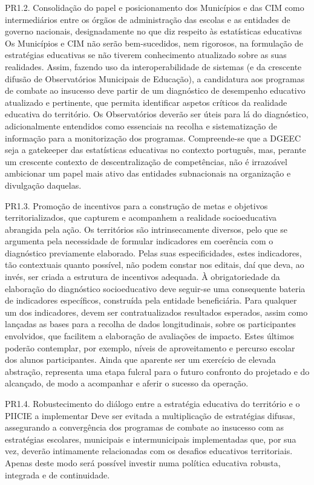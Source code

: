 \documentclass[
]{book}
\begin{document}
PR1.2. Consolidação do papel e posicionamento dos Municípios e das CIM como intermediários entre os órgãos de administração das escolas e as entidades de governo nacionais, designadamente no que diz respeito às estatísticas educativas
Os Municípios e CIM não serão bem-sucedidos, nem rigorosos, na formulação de estratégias educativas se não tiverem conhecimento atualizado sobre as suas realidades. Assim, fazendo uso da interoperabilidade de sistemas (e da crescente difusão de Observatórios Municipais de Educação), a candidatura aos programas de combate ao insucesso deve partir de um diagnóstico de desempenho educativo atualizado e pertinente, que permita identificar aspetos críticos da realidade educativa do território. Os Observatórios deverão ser úteis para lá do diagnóstico, adicionalmente entendidos como essenciais na recolha e sistematização de informação para a monitorização dos programas.
Compreende-se que a DGEEC seja a gatekeeper das estatísticas educativas no contexto português, mas, perante um crescente contexto de descentralização de competências, não é irrazoável ambicionar um papel mais ativo das entidades subnacionais na organização e divulgação daquelas.

PR1.3. Promoção de incentivos para a construção de metas e objetivos territorializados, que capturem e acompanhem a realidade socioeducativa abrangida pela ação.
Os territórios são intrinsecamente diversos, pelo que se argumenta pela necessidade de formular indicadores em coerência com o diagnóstico previamente elaborado. Pelas suas especificidades, estes indicadores, tão contextuais quanto possível, não podem constar nos editais, daí que deva, ao invés, ser criada a estrutura de incentivos adequada. À obrigatoriedade da elaboração do diagnóstico socioeducativo deve seguir-se uma consequente bateria de indicadores específicos, construída pela entidade beneficiária.
Para qualquer um dos indicadores, devem ser contratualizados resultados esperados, assim como lançadas as bases para a recolha de dados longitudinais, sobre os participantes envolvidos, que facilitem a elaboração de avaliações de impacto. Estes últimos poderão contemplar, por exemplo, níveis de aproveitamento e percurso escolar dos alunos participantes. Ainda que aparente ser um exercício de elevada abstração, representa uma etapa fulcral para o futuro confronto do projetado e do alcançado, de modo a acompanhar e aferir o sucesso da operação.

PR1.4. Robustecimento do diálogo entre a estratégia educativa do território e o PIICIE a implementar
Deve ser evitada a multiplicação de estratégias difusas, assegurando a convergência dos programas de combate ao insucesso com as estratégias escolares, municipais e intermunicipais implementadas que, por sua vez, deverão intimamente relacionadas com os desafios educativos territoriais. Apenas deste modo será possível investir numa política educativa robusta, integrada e de continuidade.
\end{document}
